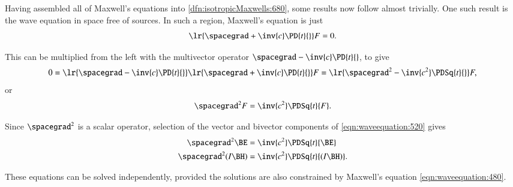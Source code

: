 %
%
Having assembled all of Maxwell's equations into \cref{dfn:isotropicMaxwells:680}, some results now follow almost trivially.
One such result is the wave equation in space free of sources.
In such a region, Maxwell's equation is just
\begin{dmath}\label{eqn:waveequation:480}
\lr{ \spacegrad + \inv{c} \PD{t}{} } F = 0.
\end{dmath}

This can be multiplied from the left with the multivector operator \( \spacegrad - \inv{c} \PD{t}{} \), to give
\begin{dmath}\label{eqn:waveequation:500}
0 =
\lr{ \spacegrad - \inv{c} \PD{t}{} }
\lr{ \spacegrad + \inv{c} \PD{t}{} } F
=
\lr{ \spacegrad^2 - \inv{c^2} \PDSq{t}{} } F,
\end{dmath}
or
\begin{dmath}\label{eqn:waveequation:520}
\spacegrad^2 F = \inv{c^2} \PDSq{t}{F}.
\end{dmath}

Since \( \spacegrad^2 \) is a scalar operator, selection of the vector and bivector components of \cref{eqn:waveequation:520} gives
\begin{dmath}\label{eqn:waveequation:540}
\begin{aligned}
\spacegrad^2 \BE &= \inv{c^2} \PDSq{t}{\BE} \\
\spacegrad^2 (I \BH) &= \inv{c^2} \PDSq{t}{(I \BH)}.
\end{aligned}
\end{dmath}

These equations can be solved independently, provided the solutions are also constrained by Maxwell's equation \cref{eqn:waveequation:480}.
